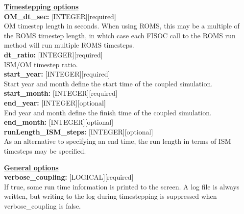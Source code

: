 \documentclass[12pt]{article}
\begin{document}
\begin{flushleft}
\textbf{\underline{Timestepping options}}                                  \\
\textbf{OM\_dt\_sec:}         [INTEGER][required]                          \\
OM timestep length in seconds.  When using ROMS, this may be a multiple 
of the ROMS timestep length, in which case each FISOC call to the ROMS 
run method will run multiple ROMS timesteps.                               \\
\vspace{6pt}
\textbf{dt\_ratio:}          [INTEGER][required]                           \\
ISM/OM timestep ratio.                                                     \\
\vspace{6pt}
\textbf{start\_year:}        [INTEGER][required]                           \\
Start year and month define the start time of the coupled simulation.      \\
\vspace{6pt}
\textbf{start\_month:}       [INTEGER][required]                           \\
\vspace{6pt}
\textbf{end\_year:}          [INTEGER][optional]                           \\
End year and month define the finish time of the coupled simulation.       \\
\vspace{6pt}
\textbf{end\_month:}         [INTEGER][optional]                           \\
\vspace{6pt}
\textbf{runLength\_ISM\_steps:} [INTEGER][optional]                        \\
As an alternative to specifying an end time, the run length in terms of 
ISM timesteps may be specified.                                            \\
\vspace{22pt}


\textbf{\underline{General options}}                                       \\
\textbf{verbose\_coupling:}  [LOGICAL][required]                           \\
If true, some run time information is printed to the screen.  
A log file is always 
written, but writing to the log during timestepping is suppressed when 
verbose\_coupling is false.\\
\end{flushleft}
\end{document}
